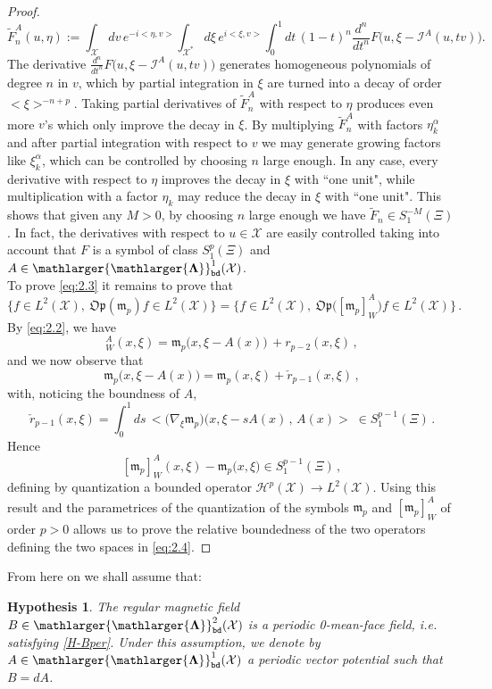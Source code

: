 \documentclass[12pt]{article}
\theoremstyle{definition}
\newtheorem{hypothesis}[theorem]{Hypothesis}
\def\Op{\mathfrak{Op}}
\def\X{\mathcal X}
\def\beq{\begin{equation}}
\def\eeq{\end{equation}}
\def\Fb{\mathlarger{\mathlarger{\mathbf{\Lambda}}}_{\text{\tt bd}}}
\def\mI{\mathcal{I}}
\numberwithin{equation}{section}
\begin{document}
\begin{proof}
	$$\tilde{F}^A_n(u,\eta):=\int_\X dv\,  e^{-i<\eta,v>} \int_{\X^*} d\xi \,  e^{i<\xi,v>} \int_0^1 dt\,(1-t)^n  \frac{d^n}{dt^n}F\big (u,\xi -\mI^A(u,tv)\big ).$$
	The derivative $\frac{d^n}{dt^n}F\big (u,\xi -\mI^A(u,tv)\big )$ generates  homogeneous polynomials of degree $n$ in $v$, which by partial integration in $\xi$ are turned into a decay of order $<\xi>^{-n+p}$. Taking partial derivatives of $\tilde{F}^A_n$ with respect to $\eta$ produces even more $v$'s which only improve the decay in $\xi$. By multiplying $\tilde{F}^A_n$ with factors $\eta_k^\alpha$ and after partial integration with respect to $v$ we may generate growing factors like $\xi_k^\alpha$, which can be controlled by choosing $n$ large enough. In any case, every derivative with respect to $\eta$ improves the decay in $\xi$ with ``one unit", while multiplication with a factor $\eta_k$ may reduce the decay in $\xi$ with ``one unit". This shows that given any $M>0$, by choosing $n$ large enough we have $\tilde{F}_n\in S_1^{-M}(\Xi)$. In fact, the derivatives with respect to $u\in\X$ are easily controlled taking into account that $F$ is a symbol of class $S^p_1(\Xi)$ and $A\in\Fb^1(\X)$. \\
	To prove \eqref{eq:2.3} it remains to prove that
	\beq \label{eq:2.4}
\big\{f\in{L}^2(\X),\ \Op(\mathfrak{m}_p)f\in{L}^2(\X)\big\}=\big\{f\in{L}^2(\X),\ \Op\big([\mathfrak{m}_p]^A_W\big)f\in{L}^2(\X)\big\}\,.
\eeq
By \eqref{eq:2.2}, we have 
\beq
[\mathfrak{m}_p]^A_W(x,\xi)=\mathfrak{m}_p\big(x,\xi-A(x)\big)\,+ r_{p-2}(x,\xi)\,,
\eeq
and we now observe that
\beq
\mathfrak{m}_p\big(x,\xi-A(x)\big)= \mathfrak{m}_p(x,\xi) +\check r_{p-1}(x,\xi)\,,
\eeq
with, noticing the boundness of $A$, 
\beq
\check{r}_{p-1}(x,\xi)=\int_0^1ds\,<\big(\nabla_\xi\mathfrak{m}_p\big)\big(x,\xi-sA(x)\,,\,A(x)>\;  \in {S}^{p-1}_1(\Xi) \,.
\eeq
Hence
$$
[\mathfrak{m}_p]^A_W(x,\xi)-\mathfrak{m}_p\big(x,\xi \big)\in {S}^{p-1}_1(\Xi)\,,
$$
defining by quantization a bounded operator $\mathscr{H}^p(\X)\rightarrow{L}^2(\X)$. Using this result and the parametrices of the quantization of the symbols $\mathfrak{m}_p$ and $[\mathfrak{m}_p]^A_W$ of order $p>0$ allows us to prove the relative boundedness of the two operators defining the two spaces in \eqref{eq:2.4}.
\end{proof}
From here on we shall assume that:
\begin{hypothesis}\label{H-main} \textit{The regular magnetic field $B\in\Fb^2(\X)$ is a periodic 0-mean-face field, i.e. satisfying \eqref{H-Bper}. 
	Under this assumption, we denote by  $A\in\Fb^1(\X)$  a periodic vector potential such that $B=dA$.}
\end{hypothesis}
\end{document}

